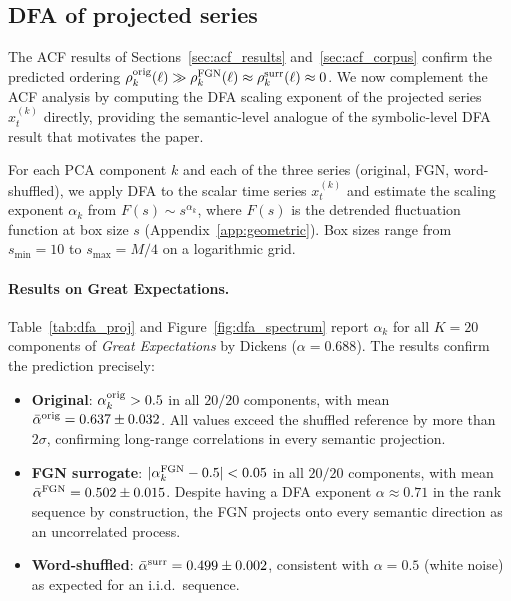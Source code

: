 \documentclass[12pt,a4paper]{article}
\begin{document}

\subsection{DFA of projected series}
\label{sec:dfa_projections}

The ACF results of Sections~\ref{sec:acf_results}
and~\ref{sec:acf_corpus} confirm the predicted ordering
$\rho_k^{\rm orig}(\ell) \gg \rho_k^{\rm FGN}(\ell) \approx
\rho_k^{\rm surr}(\ell) \approx 0$.
We now complement the ACF analysis by computing the DFA scaling
exponent of the projected series $x_t^{(k)}$ directly, providing the
semantic-level analogue of the
symbolic-level DFA result that motivates the paper.

For each PCA component $k$ and each of the three series
(original, FGN, word-shuffled), we apply DFA to the scalar
time series $x_t^{(k)}$ and estimate the scaling exponent
$\alpha_k$ from $F(s) \sim s^{\alpha_k}$, where $F(s)$ is the
detrended fluctuation function at box size $s$
(Appendix~\ref{app:geometric}).
Box sizes range from $s_{\min} = 10$ to $s_{\max} = M/4$
on a logarithmic grid.

\paragraph{Results on Great Expectations.}
Table~\ref{tab:dfa_proj} and Figure~\ref{fig:dfa_spectrum}
report $\alpha_k$ for all $K = 20$ components of
\emph{Great Expectations} by Dickens ($\alpha = 0.688$).
The results confirm the prediction precisely:

\begin{itemize}
  \item \textbf{Original}: $\alpha_k^{\rm orig} > 0.5$ in all
        $20/20$ components, with mean
        $\bar\alpha^{\rm orig} = 0.637 \pm 0.032$.
        All values exceed the shuffled reference by more than
        $2\sigma$, confirming long-range correlations in every
        semantic projection.

  \item \textbf{FGN surrogate}: $|\alpha_k^{\rm FGN} - 0.5| < 0.05$
        in all $20/20$ components, with mean
        $\bar\alpha^{\rm FGN} = 0.502 \pm 0.015$.
        Despite having a DFA exponent $\alpha \approx 0.71$
        in the rank sequence by construction, the FGN projects
        onto every semantic direction as an uncorrelated process.

  \item \textbf{Word-shuffled}: $\bar\alpha^{\rm surr} =
        0.499 \pm 0.002$, consistent with $\alpha = 0.5$
        (white noise) as expected for an i.i.d.\ sequence.
\end{itemize}
\end{document}
